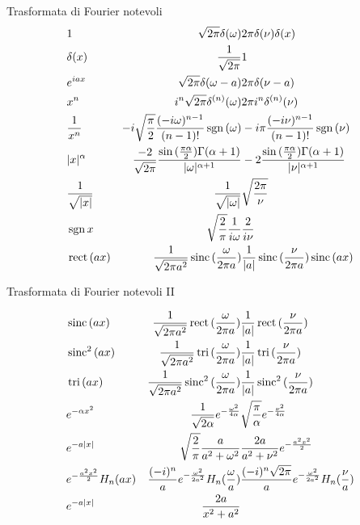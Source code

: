 \documentclass[asd-beamer.tex]{subfiles}
\begin{document}
\begin{wordonframe}{Trasformata di Fourier notevoli}
\begin{align*}
& 1 & \sqrt{2\pi}\delta(\omega) & 2\pi\delta(\nu)\delta(x)\\
& \delta(x) & \frac{1}{\sqrt{2\pi}} & 1\\
& e^{iax} & \sqrt{2\pi}\delta(\omega-a) & 2\pi\delta(\nu-a)\\
& x^n & i^n\sqrt{2\pi}\delta^{(n)}(\omega) & 2\pi i^n\delta^{(n)}(\nu)\\
& \frac{1}{x^n} & -i\sqrt{\frac{\pi}{2}}\frac{(-i\omega)^{n-1}}{(n-1)!}\operatorname{sgn}{(\omega)} & -i\pi\frac{(-i\nu)^{n-1}}{(n-1)!}\operatorname{sgn}{(\nu)}\\
& |x|^{\alpha} & \frac{-2}{\sqrt{2\pi}}\frac{\sin{(\frac{\pi\alpha}{2})}\Gamma(\alpha+1)}{|\omega|^{\alpha+1}} & -2\frac{\sin{(\frac{\pi\alpha}{2})}\Gamma(\alpha+1)}{|\nu|^{\alpha+1}}\\
& \frac{1}{\sqrt{|x|}} & \frac{1}{\sqrt{|\omega|}} & \sqrt{\frac{2\pi}{\nu}}\\
& \operatorname{sgn}{x} & \sqrt{\frac{2}{\pi}}\frac{1}{i\omega} & \frac{2}{i\nu}\\
& \operatorname{rect}{(ax)} & \frac{1}{\sqrt{2\pi a^2}}\operatorname{sinc}{(\frac{\omega}{2\pi a})} &  \frac{1}{|a|}\operatorname{sinc}{(\frac{\nu}{2\pi a})}\operatorname{sinc}{(ax)}\\
\end{align*}

\end{wordonframe}

\begin{wordonframe}{Trasformata di Fourier notevoli II}

\begin{align*}
&\operatorname{sinc}{(ax)} & \frac{1}{\sqrt{2\pi a^2}}\operatorname{rect}{(\frac{\omega}{2\pi a})} &  \frac{1}{|a|}\operatorname{rect}{(\frac{\nu}{2\pi a})}\\
&\operatorname{sinc}^2{(ax)} & \frac{1}{\sqrt{2\pi a^2}}\operatorname{tri}{(\frac{\omega}{2\pi a})} &  \frac{1}{|a|}\operatorname{tri}{(\frac{\nu}{2\pi a})}\\
&\operatorname{tri}{(ax)} & \frac{1}{\sqrt{2\pi a^2}}\operatorname{sinc}^2{(\frac{\omega}{2\pi a})} &  \frac{1}{|a|}\operatorname{sinc}^2{(\frac{\nu}{2\pi a})}\\
&e^{-\alpha x^2} & \frac{1}{\sqrt{2\alpha}}e^{-\frac{\omega^2}{4\alpha}} & \sqrt{\frac{\pi}{\alpha}}e^{-\frac{\nu^2}{4\alpha}}\\
&e^{-a|x|} & \sqrt{\frac{2}{\pi}}\frac{a}{a^2+\omega^2} & \frac{2a}{a^2+\nu^2}e^{-\frac{a^2x^2}{2}}\\
&e^{-\frac{a^2x^2}{2}}H_n(ax) & \frac{(-i)^n}{a}e^{-\frac{\omega^2}{2a^2}}H_n(\frac{\omega}{a}) & \frac{(-i)^n\sqrt{2\pi}}{a}e^{-\frac{\omega^2}{2a^2}}H_n(\frac{\nu}{a})\\
&e^{-a|x|} & \frac{2a}{x^2+a^2}
\end{align*}
\end{wordonframe}
\end{document}
